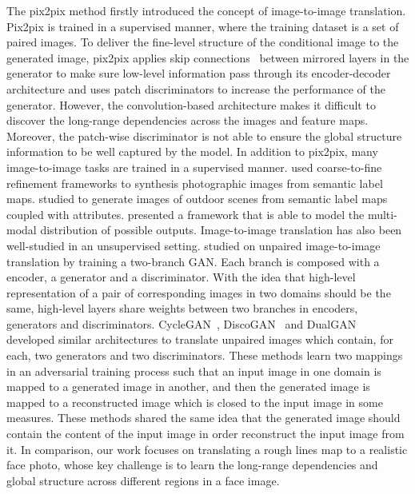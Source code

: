 The pix2pix method \cite{pix2pix} firstly introduced the concept of image-to-image translation. Pix2pix is trained in a supervised manner, where the training dataset is a set of paired images. 
To deliver the fine-level structure of the conditional image to the generated image, pix2pix applies skip connections~\cite{Unet} between mirrored layers in the generator to make sure low-level information pass through its encoder-decoder architecture and uses patch discriminators to increase the performance of the generator. 
However, the convolution-based architecture makes it difficult to discover the long-range dependencies across the images and feature maps.
Moreover, the patch-wise discriminator is not able to ensure the global structure information to be well captured by the model.
%
In addition to pix2pix, many image-to-image tasks are trained in a supervised manner. 
\cite{CRN, pix2pixHD} used coarse-to-fine refinement frameworks to synthesis photographic images from semantic label maps. 
\cite{outdoor_scene} studied to generate images of outdoor scenes from semantic label maps coupled with attributes.
\cite{BicycleGANs} presented a framework that is able to model the multi-modal distribution of possible outputs.
%
%
Image-to-image translation has also been well-studied in an unsupervised setting.
\cite{UNIT} studied on unpaired image-to-image translation by training a two-branch GAN. Each branch is composed with a encoder, a generator and a discriminator. With the idea that high-level representation of a pair of corresponding images in two domains should be the same, high-level layers share weights between two branches in encoders, generators and discriminators. 
%
CycleGAN~\cite{CycleGANs}, DiscoGAN~\cite{DiscoGANs} and DualGAN~\cite{DualGANs} developed similar architectures to translate unpaired images which contain, for each, two generators and two discriminators. These methods learn two mappings in an adversarial training process such that an input image in one domain is mapped to a generated image in another, and then the generated image is mapped to a reconstructed image which is closed to the input image in some measures. These methods shared the same idea that the generated image should contain the content of the input image in order reconstruct the input image from it. 
In comparison, our work focuses on translating a rough lines map to a realistic face photo, whose key challenge is to learn the long-range dependencies and global structure across different regions in a face image.


